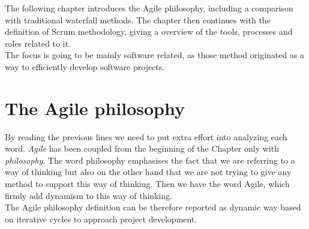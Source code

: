 \documentclass[../main.tex]{subfiles}
\begin{document}
The following chapter introduces the Agile philosophy, including a comparison with traditional waterfall methods. The chapter then continues with the definition of Scrum methodology, giving a overview of the tools, processes and roles related to it.\\
The focus is going to be mainly software related, as those method originated as a way to efficiently develop software projects.
\section{The Agile philosophy}
By reading the previous lines we need to put extra effort into analyzing each word. 
\textit{Agile} has been coupled from the beginning of the Chapter only with \textit{philosophy}.  
The word philosophy emphasises the fact that we are referring to a way of thinking but also on the other hand that we are not trying to give any method to support this way of thinking. Then we have the word Agile, which firmly add dynamism to this way of thinking.\\ 
The Agile philosophy definition can be therefore reported as dynamic way based on iterative cycles to approach project development.
\end{document}
